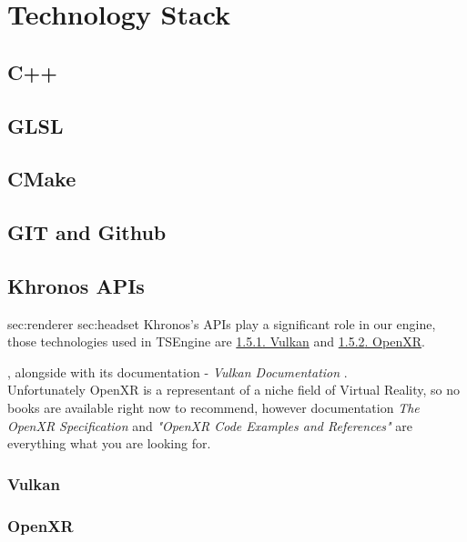 \newpage
\section{Technology Stack}
\subsection{C++}
\subsection{GLSL}
\label{sec:glsl}
\subsection{CMake}
\label{sec:stack_cmake}
\subsection{GIT and Github}
\subsection{Khronos APIs}
\label{sec:khronos}
sec:renderer sec:headset
Khronos's APIs play a significant role in our engine, those technologies used in TSEngine are \hyperref[sec:stack_vk]{\ref*{sec:stack_vk}. Vulkan} and \hyperref[sec:stack_xr]{\ref*{sec:stack_xr}. OpenXR}. 


\cite{VulkanCookbook}, alongside with its documentation - \textit{Vulkan Documentation} \cite{VkDoc}.\\ Unfortunately OpenXR is a representant of a niche field of Virtual Reality, so no books are available right now to recommend, however documentation \textit{The OpenXR Specification} \cite{XrDoc} and \textit{"OpenXR Code Examples and References"} \cite{OpenXrExamples} are everything what you are looking for. %


\subsubsection{Vulkan}
\label{sec:stack_vk}
\subsubsection{OpenXR}
\label{sec:stack_xr}